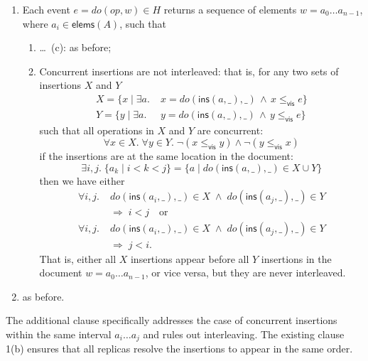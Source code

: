 \documentclass[sigconf]{acmart}
\begin{document}
\begin{enumerate}
  \item Each event $e = \mathit{do}(\mathit{op}, w) \in H$ returns a sequence of elements $w=a_0 \dots a_{n-1}$, where $a_i \in \textsf{elems}(A)$, such that
  \begin{enumerate}
    \item \dots~(c): as before;
    \setcounter{enumii}{3}
    \item Concurrent insertions are not interleaved: that is, for any two sets of insertions $X$ and $Y$
      \begin{align*}
        X = \{x \mid \exists a.\; &x = \mathit{do}(\textsf{ins}(a, \_), \_) \,\wedge\, x \le_\textsf{vis} e\}\\
        Y = \{y \mid \exists a.\; &y = \mathit{do}(\textsf{ins}(a, \_), \_) \,\wedge\, y \le_\textsf{vis} e\}
      \end{align*}
      such that all operations in $X$ and $Y$ are concurrent:
      \[ \forall x \in X.\; \forall y \in Y.\; \neg(x \le_\textsf{vis} y) \wedge \neg(y \le_\textsf{vis} x) \]
      if the insertions are at the same location in the document:
      \[ \exists i,j.\; \{a_k \mid i < k < j\} = \{a \mid \mathit{do}(\textsf{ins}(a, \_), \_) \in X \cup Y\} \]
      then we have either
      \begin{align*}
        \forall i, j.\; & \mathit{do}(\textsf{ins}(a_i, \_), \_) \in X \;\wedge\; \mathit{do}(\textsf{ins}(a_j, \_), \_) \in Y\\
        & \Longrightarrow\; i < j \quad\text{or}\\
        \forall i, j.\; & \mathit{do}(\textsf{ins}(a_i, \_), \_) \in X \;\wedge\; \mathit{do}(\textsf{ins}(a_j, \_), \_) \in Y\\
        & \Longrightarrow\; j < i.
      \end{align*}
      That is, either all $X$ insertions appear before all $Y$ insertions in the document $w=a_0 \dots a_{n-1}$, or vice versa, but they are never interleaved.
  \end{enumerate}
  \item as before.
\end{enumerate}

\noindent
The additional clause specifically addresses the case of concurrent insertions within the same interval $a_i \dots a_j$ and rules out interleaving.
The existing clause 1(b) ensures that all replicas resolve the insertions to appear in the same order.
\end{document}
